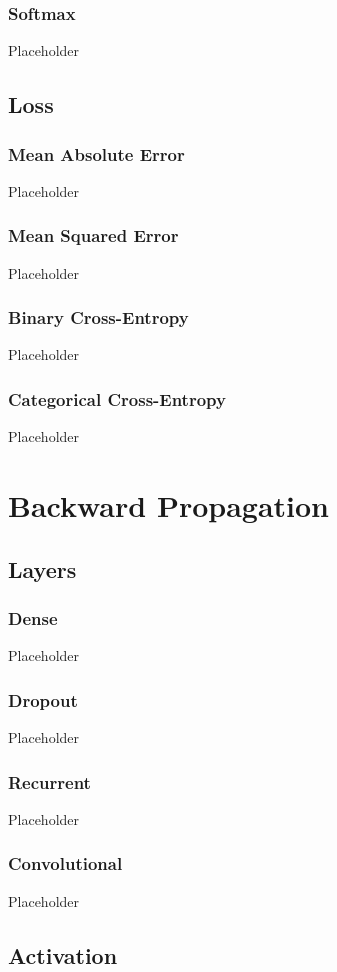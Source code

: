 \documentclass[a4paper]{article}
\begin{document}
\subsubsection*{Softmax}
Placeholder

\subsection*{Loss}
\subsubsection*{Mean Absolute Error}
Placeholder
\subsubsection*{Mean Squared Error}
Placeholder
\subsubsection*{Binary Cross-Entropy}
Placeholder
\subsubsection*{Categorical Cross-Entropy}
Placeholder

\newpage
\section*{Backward Propagation}

\subsection*{Layers}
\subsubsection*{Dense}
Placeholder
\subsubsection*{Dropout}
Placeholder
\subsubsection*{Recurrent}
Placeholder
\subsubsection*{Convolutional}
Placeholder

\subsection*{Activation}
\end{document}
